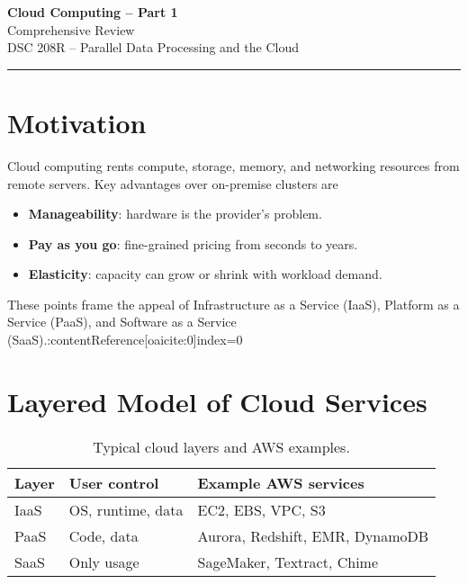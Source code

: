 \documentclass[11pt]{article}
\begin{document}
\begin{center}
  {\LARGE\bfseries Cloud Computing -- Part 1}\\[2mm]
  {\large Comprehensive Review}\\[1mm]
  {\normalsize DSC 208R -- Parallel Data Processing and the Cloud}
\end{center}
\vspace{-0.6em}\hrule\vspace{0.9em}

\tableofcontents
\newpage

\section{Motivation}

Cloud computing rents compute, storage, memory, and networking resources from remote servers.  
Key advantages over on-premise clusters are

\begin{itemize}[itemsep=0pt]
  \item \textbf{Manageability}: hardware is the provider’s problem.
  \item \textbf{Pay as you go}: fine-grained pricing from seconds to years.
  \item \textbf{Elasticity}: capacity can grow or shrink with workload demand.
\end{itemize}
These points frame the appeal of Infrastructure as a Service (IaaS), Platform as a Service (PaaS), and Software as a Service (SaaS).:contentReference[oaicite:0]{index=0}

\section{Layered Model of Cloud Services}

\begin{table}[h]
\centering
\caption{Typical cloud layers and AWS examples.}
\begin{tabular}{@{}lll@{}}
\toprule
Layer & User control & Example AWS services\\
\midrule
IaaS & OS, runtime, data & EC2, EBS, VPC, S3\\
PaaS & Code, data        & Aurora, Redshift, EMR, DynamoDB\\
SaaS & Only usage       & SageMaker, Textract, Chime\\
\bottomrule
\end{tabular}
\end{table}
\end{document}
